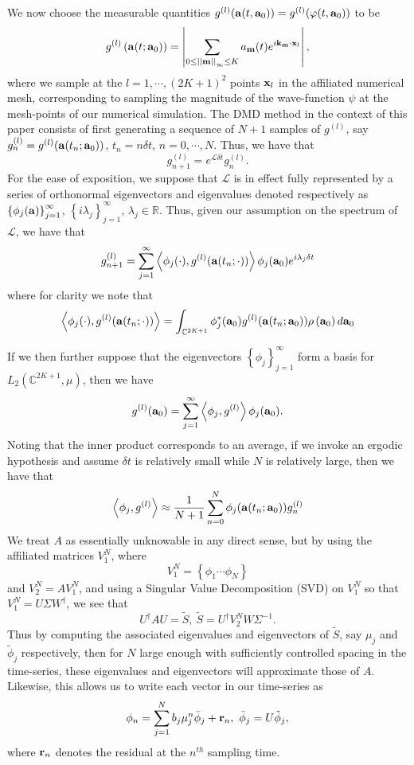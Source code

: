 \documentclass[aps,prl,preprint,groupedaddress]{revtex4-1}
\newcommand{\gnorm}[1]{\left|\left| #1\right|\right|}
\begin{document}
We now choose the measurable quantities $g^{(l)}({\bf a}(t,{\bf a}_{0})) = g^{(l)}(\varphi(t,{\bf a}_{0}))$ to be 
\[
g^{(l)}\left({\bf a}(t;{\bf a}_{0})\right) = \left|\sum_{0\leq\gnorm{{\bf m}}_{\infty}\leq K}a_{{\bf m}}(t)e^{i{\bf k}_{{\bf m}}\cdot {\bf x}_{l}} \right|,
\]
where we sample at the $l=1, \cdots, (2K+1)^{2}$ points ${\bf x}_{l}$ in the affiliated numerical mesh, corresponding to sampling the magnitude of the wave-function $\psi$ at the mesh-points of our numerical simulation.  The DMD method in the context of this paper consists of first generating a sequence of $N+1$ samples of $g^{(l)}$, say $g^{(l)}_{n} = g^{(l)}({\bf a}(t_{n};{\bf a}_{0}))$, $t_{n}=n\delta t $, $n=0,\cdots,N$.   Thus, we have that 
\[
g^{(l)}_{n+1} = e^{\mathcal{L}\delta t} g^{(l)}_{n}.  
\] 
For the ease of exposition, we suppose that $\mathcal{L}$ is in effect fully represented by a series of orthonormal eigenvectors and eigenvalues denoted respectively as $\left\{\phi_{j}({\bf a})\right\}_{j=1}^{\infty}$, $\left\{i\lambda_{j}\right\}_{j=1}^{\infty}$, $\lambda_{j}\in\mathbb{R}$.  Thus, given our assumption on the spectrum of $\mathcal{L}$, we have that 
\[
g^{(l)}_{n+1} = \sum_{j=1}^{\infty}\left<\phi_{j}(\cdot),g^{(l)}({\bf a}(t_{n};\cdot))\right>\phi_{j}({\bf a}_{0})e^{i\lambda_{j}\delta t}
\]
where for clarity we note that
\[
\left<\phi_{j}(\cdot),g^{(l)}({\bf a}(t_{n};\cdot))\right> = \int_{\mathbb{C}^{2K+1}}\phi^{\ast}_{j}({\bf a}_{0})g^{(l)}({\bf a}(t_{n};{\bf a}_{0}))\rho\left({\bf a}_{0}\right)d{\bf a}_{0}
\] 

If we then further suppose that the eigenvectors $\left\{\phi_{j}\right\}_{j=1}^{\infty}$ form a basis for $L_{2}(\mathbb{C}^{2K+1},\mu)$, then we have 
\[
g^{(l)}({\bf a}_{0}) = \sum_{j=1}^{\infty}\left<\phi_{j},g^{(l)}\right>\phi_{j}({\bf a}_{0}).
\]
Noting that the inner product corresponds to an average, if we invoke an ergodic hypothesis and assume $\delta t$ is relatively small while $N$ is relatively large, then we have that 
\[
\left<\phi_{j},g^{(l)}\right> \approx \frac{1}{N+1}\sum_{n=0}^{N}\phi_{j}({\bf a}(t_{n};{\bf a}_{0}))g^{(l)}_{n}
\]
We treat $A$ as essentially unknowable in any direct sense, but by using the affiliated matrices $V_{1}^{N}$, where
\[
V^{N}_{1} = \left\{\phi_{1} \cdots \phi_{N} \right\}
\]
and $V_{2}^{N} = AV_{1}^{N}$, and using a Singular Value Decomposition (SVD) on $V_{1}^{N}$ so that $V_{1}^{N} = U\Sigma W^{\dagger}$, we see that 
\[
U^{\dagger}AU = \tilde{S}, ~ \tilde{S} = U^{\dagger}V_{2}^{N}W\Sigma^{-1}.
\]
Thus by computing the associated eigenvalues and eigenvectors of $\tilde{S}$, say $\mu_{j}$ and $\tilde{\phi}_{j}$ respectively, then for $N$ large enough with sufficiently controlled spacing in the time-series, these eigenvalues and eigenvectors will approximate those of $A$.  Likewise, this allows us to write each vector in our time-series as 
\[
\phi_{n} = \sum_{j=1}^{N} b_{j}\mu_{j}^{n} \bar{\phi}_{j} + {\bf r}_{n}, ~ \bar{\phi}_{j} = U \tilde{\phi}_{j},
\]
where ${\bf r}_{n}$ denotes the residual at the $n^{th}$ sampling time. 
\end{document}
